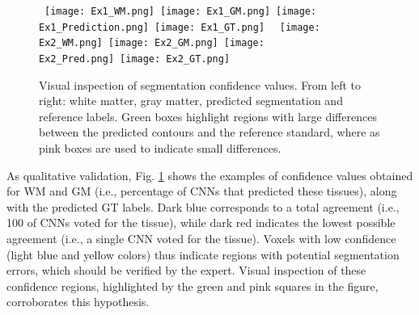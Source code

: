 \documentclass[twoside,espcrc2]{elsarticle}
\begin{document}
\begin{figure}[ht!]
\begin{center}
     \mbox{
        \texttt{[image: Ex1\_WM.png]}
        \hspace{-2.5 mm}
        \texttt{[image: Ex1\_GM.png]}
        \hspace{-2.5 mm}
        \texttt{[image: Ex1\_Prediction.png]} \hspace{-2.5 mm}
        \texttt{[image: Ex1\_GT.png]}
        }
    \mbox{
        \texttt{[image: Ex2\_WM.png]}
        \hspace{-2.5 mm}
        \texttt{[image: Ex2\_GM.png]}
        \hspace{-2.5 mm}
        \texttt{[image: Ex2\_Pred.png]}
        \hspace{-2.5 mm}
        \texttt{[image: Ex2\_GT.png]}
        }    
\caption{Visual inspection of segmentation confidence values. From left to right: white matter, gray matter, predicted segmentation and reference labels. Green boxes highlight regions with large differences between the predicted contours and the reference standard, where as pink boxes are used to indicate small differences. }
\label{fig:confidence}
\end{center}
\end{figure}

As qualitative validation, Fig. \ref{fig:confidence} shows the examples of confidence values obtained for WM and GM (i.e., percentage of CNNs that predicted these tissues), along with the predicted GT labels. Dark blue corresponds to a total agreement (i.e., 100 of CNNs voted for the tissue), while dark red indicates the lowest possible agreement (i.e., a single CNN voted for the tissue). Voxels with low confidence (light blue and yellow colors) thus indicate regions with potential segmentation errors, which should be verified by the expert. Visual inspection of these confidence regions, highlighted by the green and pink squares in the figure, corroborates this hypothesis.
\end{document}
